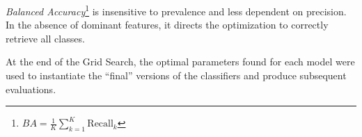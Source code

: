 \vspace{2mm}

\textit{Balanced Accuracy}\footnote{$BA = \frac{1}{K} \sum_{k=1}^{K} \text{Recall}_k$} is insensitive to prevalence and less dependent on precision. In the absence of dominant features, it directs the optimization to correctly retrieve all classes.

\vspace{2mm}

At the end of the Grid Search, the optimal parameters found for each model were used to instantiate the “final” versions of the classifiers and produce subsequent evaluations. 

